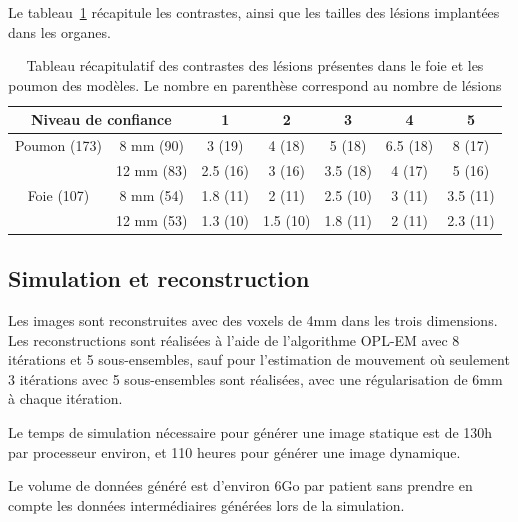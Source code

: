 Le tableau~\ref{tab:contrastePoumonFoieRecap} récapitule les contrastes, ainsi que les tailles des lésions implantées dans les organes.
 
\begin{table}
\centering
 \begin{tabular}{|c|c||c|c|c|c|c|} 
\hline
\multicolumn{2}{|c|}{Niveau de confiance}       & 1	  & 2	    & 3	     & 4	& 5	\\
\hline
\hline
Poumon	(173)	& 8 mm (90)	& 3 (19)  & 4 (18)  & 5 (18)  & 6.5 (18)	& 8 (17)\\
\cline{2-7}
		& 12 mm	(83)	& 2.5 (16)& 3 (16)  & 3.5 (18)& 4 (17)	& 5 (16)\\
\hline
Foie 	(107)	& 8 mm (54)		& 1.8 (11)& 2 (11)  & 2.5 (10)& 3 (11)	& 3.5 (11)\\
\cline{2-7}
		& 12 mm	(53)	& 1.3 (10)& 1.5 (10)& 1.8 (11)& 2 (11)  & 2.3 (11)\\
\hline 
 \end{tabular}

\caption[Tableau récapitulatif des lésions]{Tableau récapitulatif des contrastes des lésions présentes dans le foie et les poumon des modèles. Le nombre en parenthèse correspond au nombre de lésions}
\label{tab:contrastePoumonFoieRecap}


\end{table}


\subsection{Simulation et reconstruction}

Les images sont reconstruites avec des voxels de 4mm dans les trois dimensions. Les reconstructions sont réalisées à l'aide de l'algorithme OPL-EM avec 8 itérations et 5 sous-ensembles, sauf pour l'estimation de mouvement où seulement 3 itérations avec 5 sous-ensembles sont réalisées, avec une régularisation de 6mm à chaque itération. 

Le temps de simulation nécessaire pour générer une image statique est de 130h par processeur environ, et 110 heures pour générer une image dynamique.

Le volume de données généré est d'environ 6Go par patient sans prendre en compte les données intermédiaires générées lors de la simulation.

